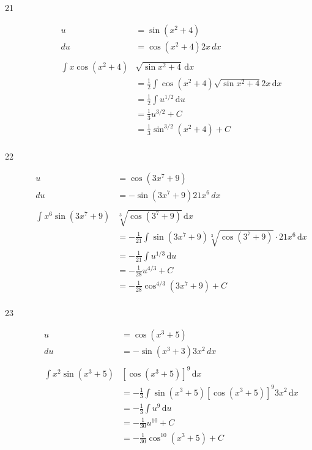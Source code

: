 \documentclass{exam}
\begin{document}
\begin{description}
\item[21]
\begin{align*}
  u &= \sin(x^2 + 4) \\
  du &= \cos(x^2 + 4) 2x \, dx \\
\\
  \int x \cos(x^2 + 4) &\sqrt{\sin{x^2 + 4}} \, \mathrm{d}x \\
  &= \frac{1}{2} \int \cos(x^2 + 4) \sqrt{\sin{x^2 + 4}} 2x \, \mathrm{d}x \\
  &= \frac{1}{2} \int u^{1/2} \, \mathrm{d}u \\
  &= \frac{1}{3} u^{3/2} + C \\
  &= \frac{1}{3} \sin^{3/2}(x^2 + 4) + C \\
\end{align*}

\item[22]
\begin{align*}
  u &= \cos(3x^7 + 9) \\
  du &= - \sin(3x^7 + 9) 21x^6 \, dx \\
\\
  \int x^6 \sin(3x^7 + 9) &\sqrt[3]{\cos(3^7 + 9)} \, \mathrm{d}x \\
  &= - \frac{1}{21} \int \sin(3x^7 + 9) \sqrt[3]{\cos(3^7 + 9)} \cdot 21x^6 \, \mathrm{d}x \\
  &= - \frac{1}{21} \int u^{1/3} \, \mathrm{d}u \\
  &= - \frac{1}{28} u^{4/3} + C \\
  &= - \frac{1}{28} \cos^{4/3}(3x^7 + 9) + C \\
\end{align*}

\item[23]
\begin{align*}
  u &= \cos(x^3 + 5) \\
  du &= - \sin(x^3 + 3) 3x^2 \, dx \\
\\
  \int x^2 \sin(x^3 + 5) & \left[ \cos(x^3 + 5) \right]^9 \, \mathrm{d}x \\
  &= - \frac{1}{3} \int \sin(x^3 + 5) \left[ \cos(x^3 + 5) \right]^9 3x^2 \, \mathrm{d}x \\
  &= -\frac{1}{3} \int u^9 \, \mathrm{d}u \\
  &= - \frac{1}{30} u^{10} + C \\
  &= - \frac{1}{30} \cos^{10}(x^3 + 5) + C \\
\end{align*}


\end{description}
\end{document}
